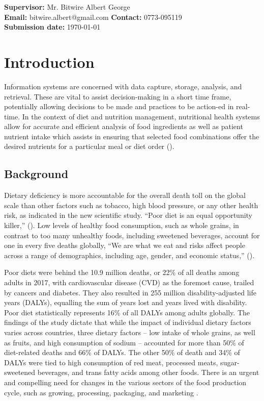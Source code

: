 \documentclass{article}
\begin{document}
\begin{center}
\vspace{60pt} 
\textbf{Supervisor:} Mr. Bitwire Albert George \\
\textbf{Email:} bitwire.albert@gmail.com \hspace{1cm} \textbf{Contact:} 0773-095119 \\
\textbf{Submission date:} \today

\end{center}

\newpage
\tableofcontents
\newpage

\section{Introduction}
\label{Introducion}
Information systems are concerned with data capture, storage, analysis, and retrieval. These are vital to assist decision-making in a short time frame, potentially allowing decisions to be made and practices to be action-ed in real-time.  In the context of diet and nutrition management, nutritional health systems allow for accurate and efficient analysis of food ingredients as well as patient nutrient intake which assists in ensuring that selected food combinations offer the desired nutrients for a particular meal or diet order (\cite{DFM}). 


\subsection{Background}
Dietary deficiency is more accountable for the overall death toll on the global scale than other factors such as tobacco, high blood pressure, or any other health risk, as indicated in the new scientific study. “Poor diet is an equal opportunity killer,” (\cite{ihme2019new}). Low levels of healthy food consumption, such as whole grains, in contrast to too many unhealthy foods, including sweetened beverages, account for one in every five deaths globally, “We are what we eat and risks affect people across a range of demographics, including age, gender, and economic status,” (\cite{ihme2019new}).

Poor diets were behind the 10.9 million deaths, or 22\% of all deaths among adults in 2017, with cardiovascular disease (CVD) as the foremost cause, trailed by cancers and diabetes. They also resulted in 255 million disability-adjusted life years (DALYs), equalling the sum of years lost and years lived with disability. Poor diet statistically represents 16\% of all DALYs among adults globally. The findings of the study dictate that while the impact of individual dietary factors varies across countries, three dietary factors – low intake of whole grains, as well as fruits, and high consumption of sodium – accounted for more than 50\% of diet-related deaths and 66\% of DALYs. The other 50\% of death and 34\% of DALYs were tied to high consumption of red meat, processed meats, sugar-sweetened beverages, and trans fatty acids among other foods. There is an urgent and compelling need for changes in the various sectors of the food production cycle, such as growing, processing, packaging, and marketing \cite{ihme2019new}.
\end{document}
